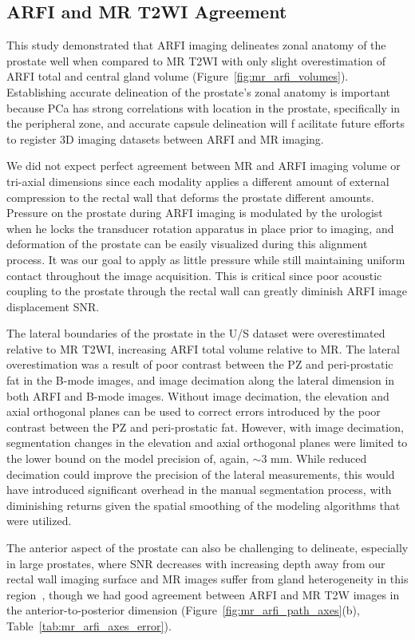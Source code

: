 \subsection{ARFI and MR T2WI Agreement}
This study demonstrated that ARFI imaging delineates zonal anatomy of the
prostate well when compared to MR T2WI with only slight overestimation of ARFI
total and central gland volume (Figure~\ref{fig:mr_arfi_volumes}).
Establishing accurate delineation of the prostate's zonal anatomy is important
because PCa has strong correlations with location in the prostate, specifically
in the peripheral zone, and accurate capsule delineation will f acilitate
future efforts to register 3D imaging datasets between ARFI and MR imaging. 

We did not expect perfect agreement between MR and ARFI imaging volume or
tri-axial dimensions since each modality applies a different amount of external
compression to the rectal wall that deforms the prostate different amounts.
Pressure on the prostate during ARFI imaging is modulated by the urologist when
he locks the transducer rotation apparatus in place prior to imaging, and
deformation of the prostate can be easily visualized during this alignment
process.  It was our goal to apply as little pressure while still maintaining
uniform contact throughout the image acquisition. This is critical since poor
acoustic coupling to the prostate through the rectal wall can greatly diminish
ARFI image displacement SNR.

The lateral boundaries of the prostate in the U/S dataset were overestimated
relative to MR T2WI, increasing ARFI total volume relative to MR. The lateral
overestimation was a result of poor contrast between the PZ and peri-prostatic
fat in the B-mode images, and image decimation along the lateral dimension in
both ARFI and B-mode images. Without image decimation, the elevation and axial
orthogonal planes can be used to correct errors introduced by the poor contrast
between the PZ and peri-prostatic fat. However, with image decimation,
segmentation changes in the elevation and axial orthogonal planes were limited
to the lower bound on the model precision of, again, $\sim$3 mm.  While reduced
decimation could improve the precision of the lateral measurements, this would
have introduced significant overhead in the manual segmentation process, with
diminishing returns given the spatial smoothing of the modeling algorithms that
were utilized. 

The anterior aspect of the prostate can also be challenging to delineate,
especially in large prostates, where SNR decreases with increasing depth away
from our rectal wall imaging surface and MR images suffer from gland
heterogeneity in this region~\cite{Gupta2013}, though we had good agreement
between ARFI and MR T2W images in the anterior-to-posterior dimension
(Figure~\ref{fig:mr_arfi_path_axes}(b), Table~\ref{tab:mr_arfi_axes_error}).

